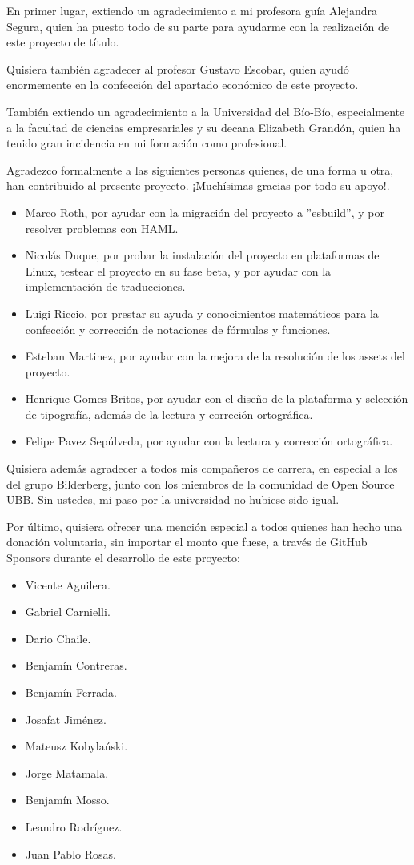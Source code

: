 En primer lugar, extiendo un agradecimiento a mi profesora guía Alejandra Segura, quien ha puesto todo de su parte para ayudarme con la realización de este proyecto de título.

Quisiera también agradecer al profesor Gustavo Escobar, quien ayudó enormemente en la confección del apartado económico de este proyecto.

También extiendo un agradecimiento a la Universidad del Bío-Bío, especialmente a la facultad de ciencias empresariales y su decana Elizabeth Grandón, quien ha tenido gran incidencia en mi formación como profesional.

Agradezco formalmente a las siguientes personas quienes, de una forma u otra, han contribuido al presente proyecto. ¡Muchísimas gracias por todo su apoyo!.

\begin{itemize}
	\item Marco Roth, por ayudar con la migración del proyecto a ''esbuild'', y por resolver problemas con HAML.
	\item Nicolás Duque, por probar la instalación del proyecto en plataformas de Linux, testear el proyecto en su fase beta, y por ayudar con la implementación de traducciones.
	\item Luigi Riccio, por prestar su ayuda y conocimientos matemáticos para la confección y corrección de notaciones de fórmulas y funciones. 
	\item Esteban Martinez, por ayudar con la mejora de la resolución de los assets del proyecto.
	\item Henrique Gomes Britos, por ayudar con el diseño de la plataforma y selección de tipografía, además de la lectura y correción ortográfica.
  \item Felipe Pavez Sepúlveda, por ayudar con la lectura y corrección ortográfica.
\end{itemize}

\pagebreak

Quisiera además agradecer a todos mis compañeros de carrera, en especial a los del grupo Bilderberg, junto con los miembros de la comunidad de Open Source UBB. Sin ustedes, mi paso por la universidad no hubiese sido igual.

Por último, quisiera ofrecer una mención especial a todos quienes han hecho una donación voluntaria, sin importar el monto que fuese, a través de GitHub Sponsors durante el desarrollo de este proyecto:
\begin{itemize}
  \item Vicente Aguilera.
  \item Gabriel Carnielli.
  \item Dario Chaile.
  \item Benjamín Contreras.
  \item Benjamín Ferrada.
  \item Josafat Jiménez.
  \item Mateusz Kobylański.
  \item Jorge Matamala.
  \item Benjamín Mosso.
  \item Leandro Rodríguez.
  \item Juan Pablo Rosas.
\end{itemize}
